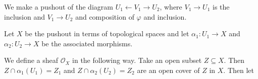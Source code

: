 \newcommand{\sheet}{5}




\maketitle{}

\begin{exercise}{1}
    We make a pushout of the diagram $U_1 \leftarrow V_1 \rightarrow U_2$, where
    $V_1 \rightarrow U_1$ is the inclusion and $V_1 \rightarrow U_2$ and
    composition of $\varphi$ and inclusion.

    Let $X$ be the pushout in terms of topological spaces and let $\alpha_1
    \colon U_1 \rightarrow X$ and $\alpha_2 \colon U_2 \rightarrow X$ be the
    associated morphisms.

    We define a sheaf $\mathcal{O}_X$ in the following way. Take an open subset
    $Z \subseteq X$. Then $Z \cap \alpha_1(U_1) = Z_1$ and $Z \cap \alpha_2(U_2)
    = Z_2$ are an open cover of $Z$ in $X$. Then let

\end{exercise}




